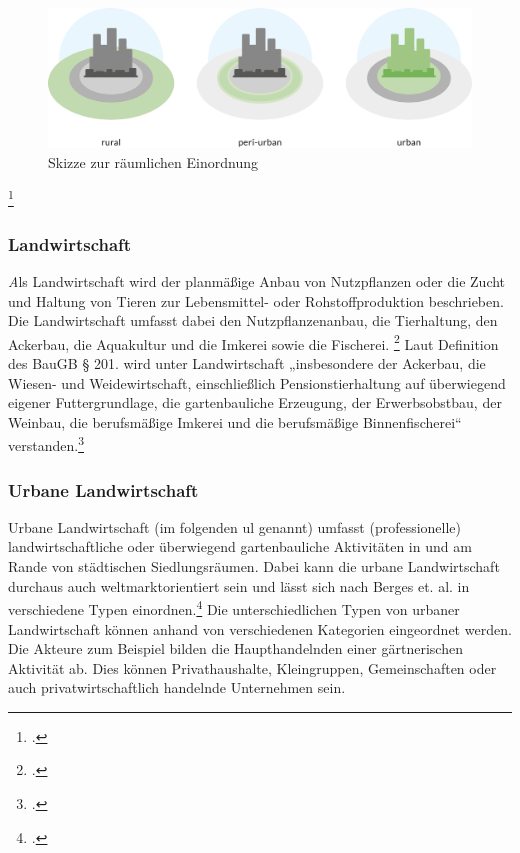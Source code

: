 \documentclass{scrartcl}
\begin{document}
\begin{figure}[htbp]
\centering
\includegraphics[width=12cm]{image_folder/SchaubildUrbaneEingrenzungen.png}
\caption{Skizze zur räumlichen Einordnung}
\label{fig:urbaneEingrenzung}
\end{figure}
\footcite[]{Eigene Zeichnung, entstanden aus dem Vorbild von Carlos Tobisch, Oasen im Beton S.26, Abb.7}

\subsubsection{Landwirtschaft}\textit
Als Landwirtschaft wird der planmäßige Anbau von Nutzpflanzen oder die Zucht und Haltung von Tieren zur Lebensmittel- oder Rohstoffproduktion beschrieben. Die Landwirtschaft umfasst dabei den Nutzpflanzenanbau, die Tierhaltung, den Ackerbau, die Aquakultur und die Imkerei sowie die Fischerei. \footcite[S. 5]{Lohrberg2001StadtnaheFreiraumplanung}  Laut Definition des BauGB § 201. wird unter Landwirtschaft „insbesondere der Ackerbau, die Wiesen- und Weidewirtschaft, einschließlich Pensionstierhaltung auf überwiegend eigener Futtergrundlage, die gartenbauliche Erzeugung, der Erwerbsobstbau, der Weinbau, die berufsmäßige Imkerei und die berufsmäßige Binnenfischerei“ verstanden.\footcite[Vgl.][§ 201]{Deutschland2017Baugesetzbuch}

\subsubsection[UL]{Urbane Landwirtschaft}
Urbane Landwirtschaft (im folgenden \acs{ul} genannt) umfasst (professionelle) landwirtschaftliche oder überwiegend gartenbauliche Aktivitäten in und am Rande von städtischen Siedlungsräumen. Dabei kann die urbane Landwirtschaft durchaus auch weltmarktorientiert sein und lässt sich nach Berges et. al. in verschiedene Typen einordnen.\footcite[]{} Die unterschiedlichen Typen von urbaner Landwirtschaft können anhand von verschiedenen Kategorien eingeordnet werden. Die Akteure zum Beispiel bilden die Haupthandelnden einer gärtnerischen Aktivität ab. Dies können Privathaushalte, Kleingruppen, Gemeinschaften oder auch privatwirtschaftlich handelnde Unternehmen sein. 
\end{document}
